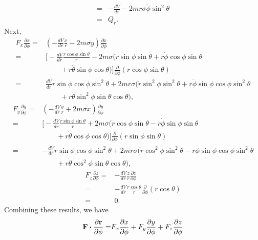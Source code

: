 \begin{questions}
\begin{solution}
\begin{parts}
\begin{align*}
=& -\frac{dV}{dr} - 2 m r \sigma \dot{\phi} \sin^2 \theta \\
=& Q_r.
\end{align*}
Next,
\begin{align*}
F_x \frac{\partial x}{\partial \phi} =& \left( -\frac{dV}{dr} \frac{x}{r} - 2 m \sigma \dot{y} \right) \frac{\partial x}{\partial \phi} \\
=& \biggl[ -\frac{dV}{dr} \frac{r \cos \phi \sin \theta}{r} - 2 m \sigma ( \dot{r} \sin \phi \sin \theta + r \dot{\phi} \cos \phi \sin \theta \\
&\qquad + r \dot{\theta} \sin \phi \cos \theta ) \biggr] \frac{\partial}{\partial \phi} ( r \cos \phi \sin \theta ) \\
=& \frac{dV}{dr} r \sin \phi \cos \phi \sin^2 \theta + 2 m r \sigma ( \dot{r} \sin^2 \phi \sin^2 \theta + r \dot{\phi} \sin \phi \cos \phi \sin^2 \theta \\
&\qquad + r \dot{\theta} \sin^2 \phi \sin \theta \cos \theta ),
\end{align*}
\begin{align*}
F_y \frac{\partial y}{\partial \phi} =& \left( -\frac{dV}{dr} \frac{y}{r} + 2 m \sigma \dot{x} \right) \frac{\partial y}{\partial \phi} \\
=& \biggl[ -\frac{dV}{dr} \frac{r \sin \phi \sin \theta}{r} + 2 m \sigma ( \dot{r} \cos \phi \sin \theta - r \dot{\phi} \sin \phi \sin \theta \\
&\qquad + r \dot{\theta} \cos \phi \cos \theta ) \biggr] \frac{\partial}{\partial \phi} ( r \sin \phi \sin \theta ) \\
=& -\frac{dV}{dr} r \sin \phi \cos \phi \sin^2 \theta + 2 m r \sigma ( \dot{r} \cos^2 \phi \sin^2 \theta - r \dot{\phi} \sin \phi \cos \phi \sin^2 \theta \\
&\qquad + r \dot{\theta} \cos^2 \phi \sin \theta \cos \theta ),
\end{align*}
\begin{align*}
F_z \frac{\partial z}{\partial \phi} =& -\frac{dV}{dr} \frac{z}{r} \frac{\partial z}{\partial \phi} \\
=& -\frac{dV}{dr} \frac{r \cos \theta}{r} \frac{\partial}{\partial \phi} ( r \cos \theta) \\
=& 0.
\end{align*}
Combining these results, we have
\begin{align*}
\vec{F} \bfcdot \frac{\partial \vec{r}}{\partial \phi} =& F_x \frac{\partial x}{\partial \phi} + F_y \frac{\partial y}{\partial \phi} + F_z \frac{\partial z}{\partial \phi} \\

\end{align*}
\end{parts}
\end{solution}
\end{questions}
